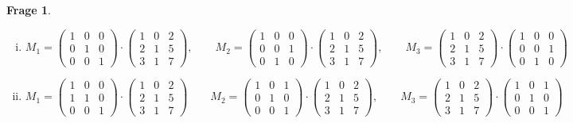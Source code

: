 \documentclass{scrartcl}
\theoremstyle{definition}
\newtheorem{frage}{Frage}[section]
\begin{document}
\begin{frage}
\begin{enumerate}[(i)]
\item \[ M_1 =
\begin{pmatrix}
  1 & 0 & 0 \\
  0 & 1 & 0 \\
  0 & 0 & 1 
\end{pmatrix} \cdot \begin{pmatrix}
  1  & 0 & 2 \\
  2  & 1 & 5 \\
  3  & 1 & 7
\end{pmatrix}, \qquad M_2 =
\begin{pmatrix}
  1 & 0 & 0 \\
  0 & 0 & 1 \\
  0 & 1 & 0 
\end{pmatrix} \cdot \begin{pmatrix}
  1  & 0 & 2 \\
  2  & 1 & 5 \\
  3  & 1 & 7
\end{pmatrix}, \qquad M_3 =
\begin{pmatrix}
  1  & 0 & 2 \\
  2  & 1 & 5 \\
  3  & 1 & 7
\end{pmatrix} \cdot \begin{pmatrix}
  1 & 0 & 0 \\
  0 & 0 & 1 \\
  0 & 1 & 0 
\end{pmatrix}
\]
\item \[ M_1 =
\begin{pmatrix}
  1 & 0 & 0 \\
  1 & 1 & 0 \\
  0 & 0 & 1 
\end{pmatrix} \cdot \begin{pmatrix}
  1  & 0 & 2 \\
  2  & 1 & 5 \\
  3  & 1 & 7
\end{pmatrix} \qquad M_2 =
\begin{pmatrix}
  1 & 0 & 1 \\
  0 & 1 & 0 \\
  0 & 0 & 1 
\end{pmatrix} \cdot \begin{pmatrix}
  1  & 0 & 2 \\
  2  & 1 & 5 \\
  3  & 1 & 7
\end{pmatrix}, \qquad M_3 =
\begin{pmatrix}
  1  & 0 & 2 \\
  2  & 1 & 5 \\
  3  & 1 & 7
\end{pmatrix} \cdot \begin{pmatrix}
  1 & 0 & 1 \\
  0 & 1 & 0 \\
  0 & 0 & 1 
\end{pmatrix}
\]
\end{enumerate}
\end{frage}
\end{document}
